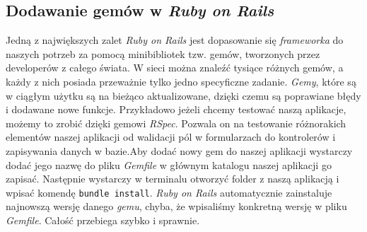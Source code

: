 \documentclass[openright]{xmgr}
\begin{document}
\subsection{Dodawanie gemów w \textit{Ruby on Rails}}
Jedną z największych zalet \textit{Ruby on Rails} jest dopasowanie się \textit{frameworka} do naszych potrzeb za pomocą minibibliotek tzw. gemów, tworzonych przez developerów z całego świata.
W sieci można znaleźć tysiące różnych gemów, a każdy z nich posiada przeważnie tylko jedno specyficzne zadanie. \textit{Gemy}, które są w ciągłym użytku są na bieżąco aktualizowane, dzięki czemu są poprawiane błędy i dodawane nowe funkcje. Przykładowo jeżeli chcemy testować naszą aplikacje, możemy to zrobić dzięki gemowi \textit{RSpec}. Pozwala on na testowanie różnorakich elementów naszej aplikacji od walidacji pól w formularzach do kontrolerów i zapisywania danych w bazie.\newline \indent Aby dodać nowy gem do naszej aplikacji wystarczy dodać jego nazwę do pliku \textit{Gemfile} w głównym katalogu naszej aplikacji go zapisać. Następnie wystarczy w terminalu otworzyć folder z naszą aplikacją i wpisać komendę \verb|bundle install|. \textit{Ruby on Rails} automatycznie zainstaluje najnowszą wersję danego \textit{gemu}, chyba, że wpisaliśmy konkretną wersję w pliku \textit{Gemfile}. Całość przebiega szybko i sprawnie.
\end{document}
